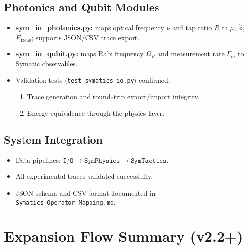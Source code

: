 \documentclass[12pt]{article}
\begin{document}
\subsection*{Photonics and Qubit Modules}
\begin{itemize}[noitemsep]
  \item \textbf{sym\_io\_photonics.py:}
        maps optical frequency $\nu$ and tap ratio $R$ to $\mu$, $\dot{\phi}$, $E_{\text{meas}}$;
        supports JSON/CSV trace export.
  \item \textbf{sym\_io\_qubit.py:}
        maps Rabi frequency $\Omega_R$ and measurement rate $\Gamma_m$ to Symatic observables.
  \item Validation tests (\texttt{test\_symatics\_io.py}) confirmed:
        \begin{enumerate}[noitemsep]
          \item Trace generation and round--trip export/import integrity.
          \item Energy equivalence through the physics layer.
        \end{enumerate}
\end{itemize}

\subsection*{System Integration}
\begin{itemize}[noitemsep]
  \item Data pipelines: $\texttt{I/O} \rightarrow \texttt{SymPhysics} \rightarrow \texttt{SymTactics}$.
  \item All experimental traces validated successfully.
  \item JSON schema and CSV format documented in \texttt{Symatics\_Operator\_Mapping.md}.
\end{itemize}

\section{Expansion Flow Summary (v2.2+)}
\end{document}
